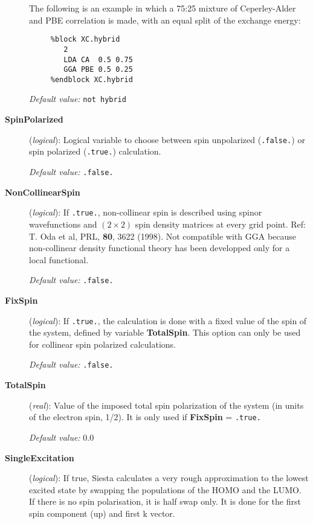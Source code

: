 \documentclass[11pt]{article}
\begin{document}
\begin{description}
The following is an example in which a 75:25 mixture of Ceperley-Alder
and PBE correlation is made, with an equal split of the exchange
energy:

\begin{verbatim}
     %block XC.hybrid
        2
        LDA CA  0.5 0.75
        GGA PBE 0.5 0.25
     %endblock XC.hybrid
\end{verbatim}

{\it Default value:} {\tt not hybrid}


\item[{\bf SpinPolarized}] ({\it logical}): 
Logical variable to choose between spin unpolarized ({\tt .false.}) 
or spin polarized ({\tt .true.}) calculation.

{\it Default value:} {\tt .false.}


\item[{\bf NonCollinearSpin}] ({\it logical}): 
If {\tt .true.}, non-collinear spin is described using spinor wavefunctions
and $(2 \times 2)$ spin density matrices at every grid point.
Ref: T. Oda et al, PRL, {\bf 80}, 3622 (1998).
Not compatible with GGA because non-collinear density functional
theory has been developped only for a local functional.

{\it Default value:} {\tt .false.}


\item[{\bf FixSpin}] ({\it logical}): 
If {\tt .true.}, the calculation is done with a fixed value of the
spin of the system, defined by variable  {\bf TotalSpin}.
This option can only be used for collinear spin polarized
calculations.

{\it Default value:} {\tt .false.}

\item[{\bf TotalSpin}] ({\it real}):
Value of the imposed total spin polarization of the system (in units of the
electron spin, 1/2). It is only used
if {\bf FixSpin} = {\tt .true.}

{\it Default value:} 0.0

\item[{\bf SingleExcitation}] ({\it logical}):
If true, {\sc Siesta} calculates a very rough approximation to 
the lowest excited state by swapping the populations of the HOMO 
and the LUMO. If there is no spin polarisation, it is half swap only. 
It is done for the first spin component (up) and first k vector.


\end{description}
\end{document}
